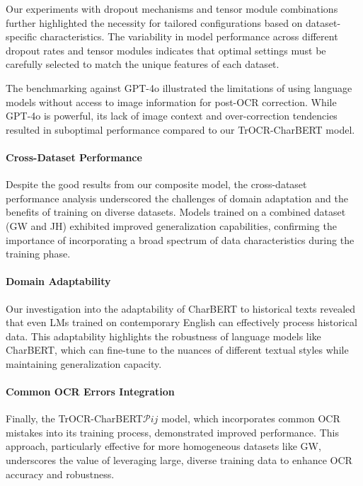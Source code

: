 Our experiments with dropout mechanisms and tensor module combinations further highlighted the necessity for tailored configurations based on dataset-specific characteristics. The variability in model performance across different dropout rates and tensor modules indicates that optimal settings must be carefully selected to match the unique features of each dataset.

The benchmarking against GPT-4o illustrated the limitations of using language models without access to image information for post-OCR correction. While GPT-4o is powerful, its lack of image context and over-correction tendencies resulted in suboptimal performance compared to our TrOCR-CharBERT model.

\paragraph*{Cross-Dataset Performance}
Despite the good results from our composite model, the cross-dataset performance analysis underscored the challenges of domain adaptation and the benefits of training on diverse datasets. Models trained on a combined dataset (GW and JH) exhibited improved generalization capabilities, confirming the importance of incorporating a broad spectrum of data characteristics during the training phase.

\paragraph*{Domain Adaptability}
Our investigation into the adaptability of CharBERT to historical texts revealed that even LMs trained on contemporary English can effectively process historical data. This adaptability highlights the robustness of language models like CharBERT, which can fine-tune to the nuances of different textual styles while maintaining generalization capacity.

\paragraph*{Common OCR Errors Integration}
Finally, the TrOCR-CharBERT${\mathcal{P}{ij}}$ model, which incorporates common OCR mistakes into its training process, demonstrated improved performance. This approach, particularly effective for more homogeneous datasets like GW, underscores the value of leveraging large, diverse training data to enhance OCR accuracy and robustness.

